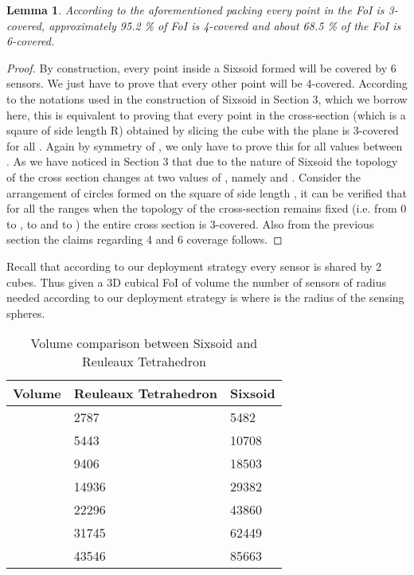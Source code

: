 \documentclass[conference]{IEEEtran}
\newtheorem{lemma}{Lemma}
\begin{document}
\begin{lemma}
According to the aforementioned packing every point in the FoI is 3-covered, approximately 
95.2 \% of FoI is 4-covered and about 68.5 \% of the FoI is 6-covered. 
\end{lemma}
\begin{proof}
By construction, every point inside a Sixsoid
formed will be covered by 6 sensors. We just have to
prove that every other point will be 4-covered. According
to the notations used in the construction of Sixsoid
in Section 3, which we borrow here, this is equivalent to
proving that every point in the cross-section (which is
a sqaure of side length R) obtained by slicing the cube
with the plane  is 3-covered for all . Again
by symmetry of , we only have to prove this for
all values between . As we have noticed in
Section 3 that due to the nature of Sixsoid the topology
of the cross section changes at two values of , namely
 and . Consider the arrangement of circles
formed on the square of side length , it can be verified that for
all the ranges when the topology of the cross-section remains fixed
(i.e. from 0 to ,  to  and  to ) the entire cross
section is 3-covered. Also from the previous section the claims regarding 
4 and 6 coverage follows.
\end{proof}

Recall that according to our deployment strategy every sensor is
shared by 2 cubes. Thus given a 3D cubical FoI of volume  the number of sensors of radius  needed according
to our deployment strategy is  where  is the radius of the sensing 
spheres. 

\begin{table}
\small
 \caption{Volume comparison between Sixsoid and Reuleaux Tetrahedron}
\label{t2}
\begin{center}
    \begin{tabular}{ | l | l | l |}
    \hline
    Volume   & Reuleaux Tetrahedron & Sixsoid  \\ \hline
      &2787 &  5482   \\ \hline          
      &5443 & 10708  \\ \hline
      & 9406 & 18503  \\ \hline
      &14936 & 29382  \\ \hline
      &22296 & 43860  \\ \hline
      &31745 & 62449  \\ \hline
      &43546 & 85663   \\ \hline
    \end{tabular}
\end{center}
\end{table}	
\end{document}
